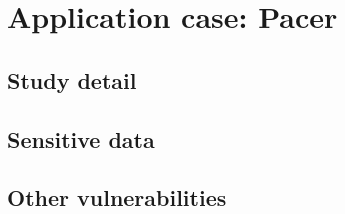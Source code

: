 \section{Application case: Pacer}
	\label{sec:pacer}
	\subsection{Study detail}
	\subsection{Sensitive data}
	\subsection{Other vulnerabilities}